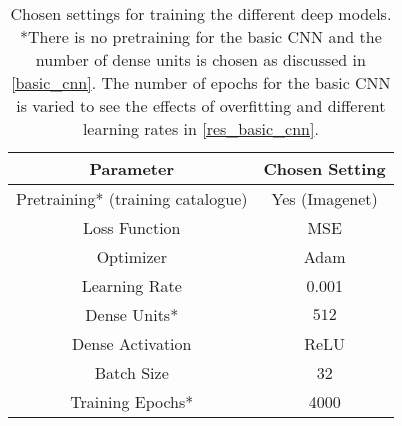 \begin{table*}[h]
\centering
\begin{tabular}{@{}cc@{}}\toprule
Parameter & Chosen Setting \\
\midrule
Pretraining* (training catalogue) & Yes (Imagenet) \\
Loss Function & MSE \\
Optimizer & Adam \\
Learning Rate & 0.001 \\
Dense Units* & $512$ \\
Dense Activation & ReLU \\
Batch Size & 32 \\
Training Epochs* & 4000 \\
\bottomrule
\end{tabular}
\caption{Chosen settings for training the different deep models. \\ *There is no pretraining for the basic CNN and the number of dense units is chosen as discussed in \cref{basic_cnn}. The number of epochs for the basic CNN is varied to see the effects of overfitting and different learning rates in \cref{res_basic_cnn}.}
\label{tab:model_settings}
\end{table*}



